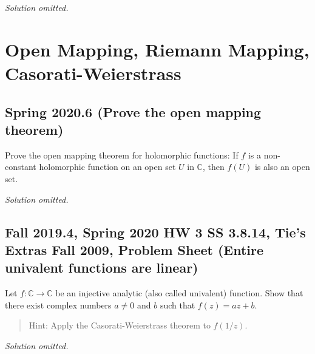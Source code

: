 \emph{Solution omitted.}

\hypertarget{open-mapping-riemann-mapping-casorati-weierstrass}{%
\section{Open Mapping, Riemann Mapping,
Casorati-Weierstrass}\label{open-mapping-riemann-mapping-casorati-weierstrass}}

\hypertarget{spring-2020.6-prove-the-open-mapping-theorem}{%
\subsection{Spring 2020.6 (Prove the open mapping
theorem)}\label{spring-2020.6-prove-the-open-mapping-theorem}}

\begin{problem}[?]

Prove the open mapping theorem for holomorphic functions: If \(f\) is a
non-constant holomorphic function on an open set \(U\) in
\(\mathbb{C}\), then \(f(U)\) is also an open set.

\end{problem}

\emph{Solution omitted.}

\hypertarget{fall-2019.4-spring-2020-hw-3-ss-3.8.14-ties-extras-fall-2009-problem-sheet-entire-univalent-functions-are-linear}{%
\subsection{Fall 2019.4, Spring 2020 HW 3 SS 3.8.14, Tie's Extras Fall
2009, Problem Sheet (Entire univalent functions are
linear)}\label{fall-2019.4-spring-2020-hw-3-ss-3.8.14-ties-extras-fall-2009-problem-sheet-entire-univalent-functions-are-linear}}

\begin{problem}

Let \(f: \mathbb{C} \rightarrow \mathbb{C}\) be an injective analytic
(also called univalent) function. Show that there exist complex numbers
\(a \neq 0\) and \(b\) such that \(f(z)=a z+b\).

\begin{quote}
Hint: Apply the Casorati-Weierstrass theorem to \(f(1/z)\).
\end{quote}

\end{problem}

\emph{Solution omitted.}

